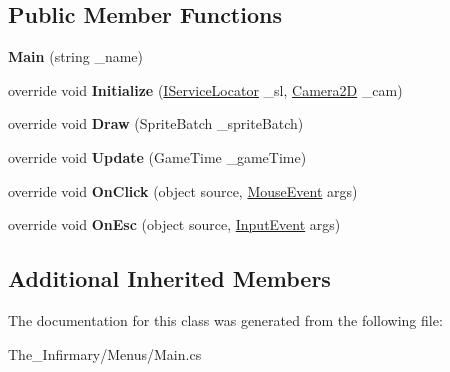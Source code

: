 \subsection*{Public Member Functions}
\begin{DoxyCompactItemize}
\item 
\mbox{\label{class_the___infirmary_1_1_menus_1_1_main_a8cc243923e6af4cd440c8500ccf96d0c}} 
{\bfseries Main} (string \+\_\+name)
\item 
\mbox{\label{class_the___infirmary_1_1_menus_1_1_main_a31533e43a2c246b77c7050927d2b9296}} 
override void {\bfseries Initialize} (\mbox{\hyperlink{interface_g_m_t_b_1_1_interfaces_1_1_i_service_locator}{I\+Service\+Locator}} \+\_\+sl, \mbox{\hyperlink{class_g_m_t_b_1_1_camera2_d}{Camera2D}} \+\_\+cam)
\item 
\mbox{\label{class_the___infirmary_1_1_menus_1_1_main_a7159e7e54479005a87a31817bc046dca}} 
override void {\bfseries Draw} (Sprite\+Batch \+\_\+sprite\+Batch)
\item 
\mbox{\label{class_the___infirmary_1_1_menus_1_1_main_ab5d4f309d6c775543a0046f5204cc6f4}} 
override void {\bfseries Update} (Game\+Time \+\_\+game\+Time)
\item 
\mbox{\label{class_the___infirmary_1_1_menus_1_1_main_ac6a7b9d106194342ef3ffc5e93f4e51c}} 
override void {\bfseries On\+Click} (object source, \mbox{\hyperlink{class_g_m_t_b_1_1_input_system_1_1_mouse_event}{Mouse\+Event}} args)
\item 
\mbox{\label{class_the___infirmary_1_1_menus_1_1_main_ad395d76e5819b503c8d71c5e3b5d50b1}} 
override void {\bfseries On\+Esc} (object source, \mbox{\hyperlink{class_g_m_t_b_1_1_input_system_1_1_input_event}{Input\+Event}} args)
\end{DoxyCompactItemize}
\subsection*{Additional Inherited Members}


The documentation for this class was generated from the following file\+:\begin{DoxyCompactItemize}
\item 
The\+\_\+\+Infirmary/\+Menus/Main.\+cs\end{DoxyCompactItemize}
